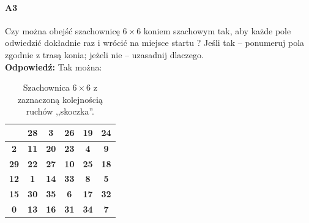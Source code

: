 \paragraph{A3}  Czy można obejść szachownicę  $6 \times 6$ koniem szachowym tak, aby każde pole odwiedzić dokładnie raz i wrócić na miejsce startu ?  Jeśli tak – ponumeruj pola zgodnie z trasą  konia; jeżeli nie – uzasadnij dlaczego. \\
\textbf{Odpowiedź:} Tak można:
\begin{table}[H]
\centering
\caption{Szachownica $6\times 6$ z zaznaczoną kolejnością ruchów ,,skoczka''.}
\begin{tabular}{|c|c|c|c|c|c|}\hline
\cellcolor[HTML]{9B9B9B}{\color[HTML]{656565} \textbf{21}} & \textbf{28} & \cellcolor[HTML]{9B9B9B}\textbf{3} & \textbf{26} & \cellcolor[HTML]{9B9B9B}\textbf{19} & \textbf{24} \\\hline
\textbf{2} & \cellcolor[HTML]{9B9B9B}\textbf{11} & \textbf{20} & \cellcolor[HTML]{9B9B9B}\textbf{23} & \textbf{4} & \cellcolor[HTML]{9B9B9B}\textbf{9} \\\hline
\cellcolor[HTML]{9B9B9B}\textbf{29} & \textbf{22} & \cellcolor[HTML]{9B9B9B}\textbf{27} & \textbf{10} & \cellcolor[HTML]{9B9B9B}\textbf{25} & \textbf{18} \\\hline
\textbf{12} & \cellcolor[HTML]{9B9B9B}\textbf{1} & \textbf{14} & \cellcolor[HTML]{9B9B9B}\textbf{33} & \textbf{8} & \cellcolor[HTML]{9B9B9B}\textbf{5} \\\hline
\cellcolor[HTML]{9B9B9B}\textbf{15} & \textbf{30} & \cellcolor[HTML]{9B9B9B}\textbf{35} & \textbf{6} & \cellcolor[HTML]{9B9B9B}\textbf{17} & \textbf{32} \\\hline
\textbf{0} & \cellcolor[HTML]{9B9B9B}\textbf{13} & \textbf{16} & \cellcolor[HTML]{9B9B9B}\textbf{31} & \textbf{34} & \cellcolor[HTML]{9B9B9B}\textbf{7}\\\hline
\end{tabular}
\end{table}

